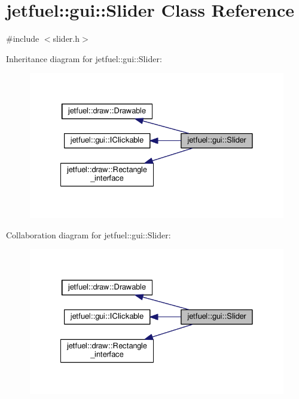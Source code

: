 \hypertarget{classjetfuel_1_1gui_1_1Slider}{}\section{jetfuel\+:\+:gui\+:\+:Slider Class Reference}
\label{classjetfuel_1_1gui_1_1Slider}


{\ttfamily \#include $<$slider.\+h$>$}



Inheritance diagram for jetfuel\+:\+:gui\+:\+:Slider\+:
\nopagebreak
\begin{figure}[H]
\begin{center}
\leavevmode
\includegraphics[width=328pt]{classjetfuel_1_1gui_1_1Slider__inherit__graph}
\end{center}
\end{figure}


Collaboration diagram for jetfuel\+:\+:gui\+:\+:Slider\+:
\nopagebreak
\begin{figure}[H]
\begin{center}
\leavevmode
\includegraphics[width=328pt]{classjetfuel_1_1gui_1_1Slider__coll__graph}
\end{center}
\end{figure}
